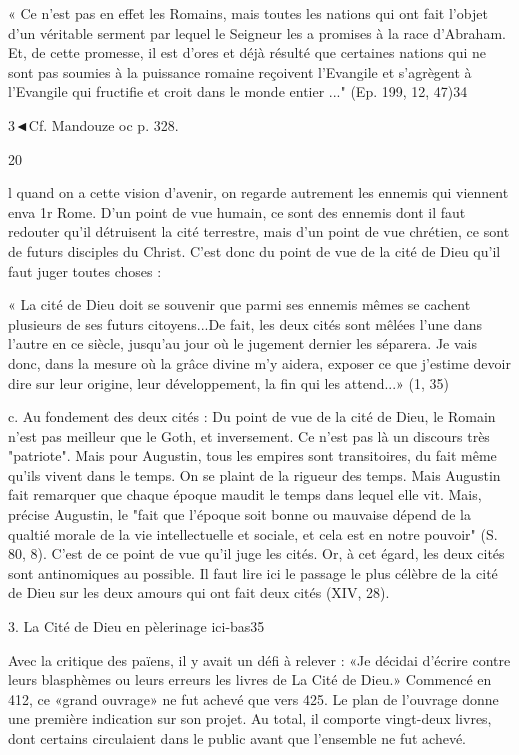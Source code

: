 « Ce n'est pas en effet les Romains, mais toutes les nations qui ont fait l'objet d'un véritable serment par lequel le Seigneur les a promises à la race d'Abraham. Et, de cette promesse, il est d'ores et déjà résulté que certaines nations qui ne sont pas soumies à la puissance romaine reçoivent l'Evangile et s'agrègent à l'Evangile qui fructifie et croit dans le monde entier ..." (Ep. 199, 12, 47)34



3◄Cf. Mandouze oc p. 328.

20
 
l
quand on a cette vision d'avenir, on regarde autrement les ennemis qui viennent enva 1r Rome. D'un point de vue humain, ce sont des ennemis dont il faut redouter qu'il détruisent la cité terrestre, mais d'un point de vue chrétien, ce sont de futurs disciples du Christ. C'est donc du point de vue de la cité de Dieu qu'il faut juger toutes choses :

« La cité de Dieu doit se souvenir que parmi ses ennemis mêmes se cachent plusieurs de ses futurs citoyens...De fait, les deux cités sont mêlées l'une dans l'autre en ce siècle, jusqu'au jour où le jugement dernier les séparera. Je vais donc, dans la mesure où la grâce divine m'y aidera, exposer ce que j'estime devoir dire sur leur origine, leur développement, la fin qui les attend...» (1, 35)

c.	Au fondement des deux cités : Du point de vue de la cité de Dieu, le Romain n'est pas meilleur que le Goth, et inversement. Ce n'est pas là un discours très "patriote". Mais pour Augustin, tous les empires sont transitoires, du fait même qu'ils vivent dans le temps. On se plaint de la rigueur des temps. Mais Augustin fait remarquer que chaque époque maudit le temps dans lequel elle vit. Mais, précise Augustin, le "fait que l'époque soit bonne ou mauvaise dépend de la qualtié morale de la vie intellectuelle et sociale, et cela est en notre pouvoir" (S. 80, 8). C'est de ce point de vue qu'il juge les cités. Or, à cet égard, les deux cités sont antinomiques au possible. Il faut lire ici le passage le plus célèbre de la cité de Dieu sur les deux amours qui ont fait deux cités (XIV, 28).

3.	La Cité de Dieu en pèlerinage ici-bas35

Avec la critique des païens, il y avait un défi à relever : «Je décidai d'écrire contre leurs blasphèmes ou leurs erreurs les livres de La Cité de Dieu.» Commencé en 412, ce «grand ouvrage» ne fut achevé que vers 425. Le plan de l'ouvrage donne une première indication sur son projet. Au total, il comporte vingt-deux livres, dont certains circulaient dans le public avant que l'ensemble ne fut achevé.

